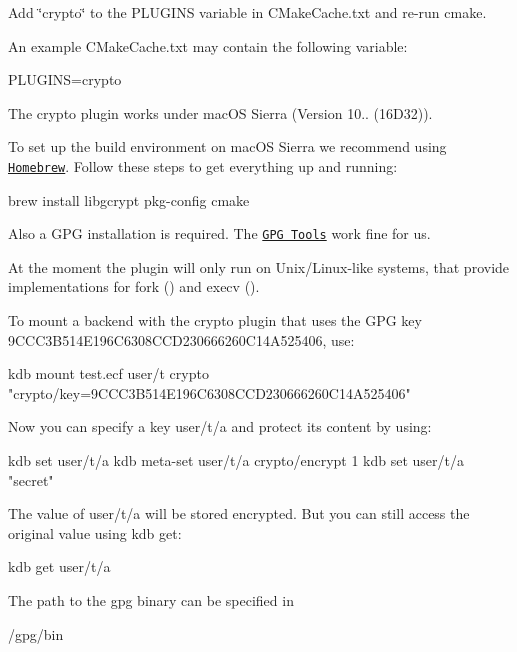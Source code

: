 Add \char`\"{}crypto\char`\"{} to the {\ttfamily P\+L\+U\+G\+I\+NS} variable in {\ttfamily C\+Make\+Cache.\+txt} and re-\/run {\ttfamily cmake}.

An example {\ttfamily C\+Make\+Cache.\+txt} may contain the following variable\+:


\begin{DoxyCode}
PLUGINS=crypto
\end{DoxyCode}


The crypto plugin works under mac\+OS Sierra (Version 10.. (16\+D32)).

To set up the build environment on mac\+OS Sierra we recommend using \href{http://brew.sh/}{\tt Homebrew}. Follow these steps to get everything up and running\+:


\begin{DoxyCode}
brew install libgcrypt pkg-config cmake
\end{DoxyCode}


Also a G\+PG installation is required. The \href{https://gpgtools.org}{\tt G\+PG Tools} work fine for us.

At the moment the plugin will only run on Unix/\+Linux-\/like systems, that provide implementations for {\ttfamily fork ()} and {\ttfamily execv ()}.

To mount a backend with the crypto plugin that uses the G\+PG key 9\+C\+C\+C3\+B514\+E196\+C6308\+C\+C\+D230666260\+C14\+A525406, use\+:


\begin{DoxyCode}
kdb mount test.ecf user/t crypto "crypto/key=9CCC3B514E196C6308CCD230666260C14A525406"
\end{DoxyCode}


Now you can specify a key {\ttfamily user/t/a} and protect its content by using\+:


\begin{DoxyCode}
kdb set user/t/a
kdb meta-set user/t/a crypto/encrypt 1
kdb set user/t/a "secret"
\end{DoxyCode}


The value of {\ttfamily user/t/a} will be stored encrypted. But you can still access the original value using {\ttfamily kdb get}\+:


\begin{DoxyCode}
kdb get user/t/a
\end{DoxyCode}


The path to the gpg binary can be specified in


\begin{DoxyCode}
/gpg/bin
\end{DoxyCode}


